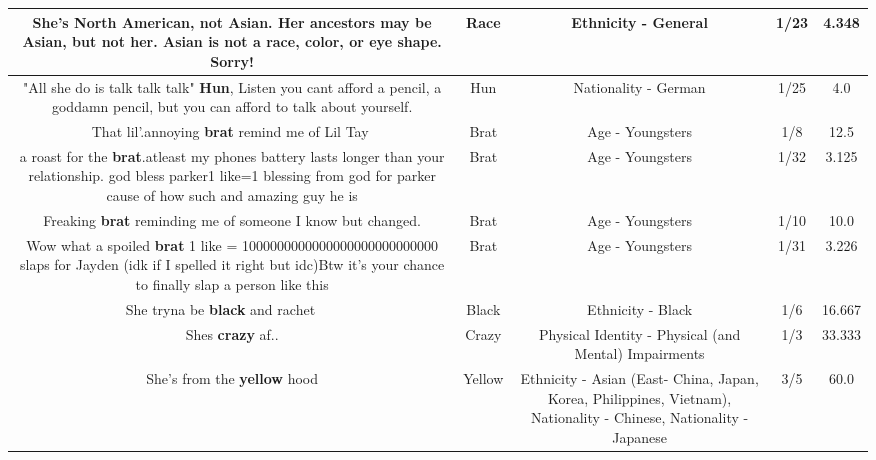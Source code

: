 \documentclass[11pt]{article}
\newlength\mylength
\begin{document}
\begin{center}
\begin{longtable}{|C{.65\mylength}|C{.30\mylength}|C{.12\mylength}|C{.12\mylength}|C{.12\mylength}|}
  \small She's North American, not Asian. Her ancestors may be Asian, but not her. Asian is not a \textbf{race}, color, or eye shape. Sorry!\normalsize   & Race & Ethnicity - General & 1/23 & 4.348 \\  \hline
  \small "All she do is talk talk talk" \textbf{Hun}, Listen you cant afford a pencil, a goddamn pencil, but you can afford to talk about yourself.\normalsize   & Hun & Nationality - German & 1/25 & 4.0 \\  \hline
  \small That lil'.annoying \textbf{brat} remind me of Lil Tay🤔\normalsize   & Brat & Age - Youngsters & 1/8 & 12.5 \\  \hline
  \small a roast for the \textbf{brat}.atleast my phones battery lasts longer than your relationship. god bless parker1 like=1 blessing from god for parker cause of how such and amazing guy he is\normalsize   & Brat & Age - Youngsters & 1/32 & 3.125 \\  \hline
  \small Freaking \textbf{brat} reminding me of someone I know but changed.\normalsize   & Brat & Age - Youngsters & 1/10 & 10.0 \\  \hline
  \small Wow what a spoiled \textbf{brat} 1 like = 1000000000000000000000000000 slaps for Jayden (idk if I spelled it right but idc)Btw it's your chance to finally slap a person like this\normalsize   & Brat & Age - Youngsters & 1/31 & 3.226 \\  \hline
  \small She tryna be \textbf{black} and rachet🤟🏽🤟🏽🤟🏽\normalsize   & Black & Ethnicity - Black & 1/6 & 16.667 \\  \hline
  \small Shes \textbf{crazy} af..\normalsize   & Crazy & Physical Identity - Physical (and Mental) Impairments & 1/3 & 33.333 \\  \hline
  \small She's from the \textbf{y\textbf{e\textbf{llow}}} hood\normalsize   & Yellow & Ethnicity - Asian (East- China, Japan, Korea, Philippines, Vietnam), Nationality - Chinese, Nationality - Japanese & 3/5 & 60.0 \\  \hline

\end{longtable}
\end{center}
\end{document}
